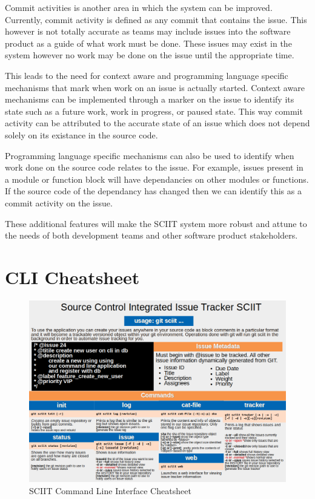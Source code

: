 \documentclass{mproj}
\begin{document}
Commit activities is another area in which the system can be improved. Currently, commit activity is defined as any commit that contains the issue. This however is not totally accurate as teams may include issues into the software product as a guide of what work must be done. These issues may exist in the system however no work may be done on the issue until the appropriate time.

This leads to the need for context aware and programming language specific mechanisms that mark when work on an issue is actually started. Context aware mechanisms can be implemented through a marker on the issue to identify its state such as a future work, work in progress, or paused state. This way commit activity can be attributed to the accurate state of an issue which does not depend solely on its existance in the source code.

Programming language specific mechanisms can also be used to identify when work done on the source code relates to the issue. For example, issues present in a module or function block will have dependancies on other modules or functions. If the source code of the dependancy has changed then we can identify this as a commit activity on the issue.

These additional features will make the SCIIT system more robust and attune to the needs of both development teams and other software product stakeholders.


\appendix %
\chapter{CLI Cheatsheet}
\begin{figure}[h!]
\caption{SCIIT Command Line Interface Cheatsheet}
\label{fig:sciit-cheatsheet}
\centering
\includegraphics[width=16cm]{Cheatsheet}
\end{figure}




\end{document}

